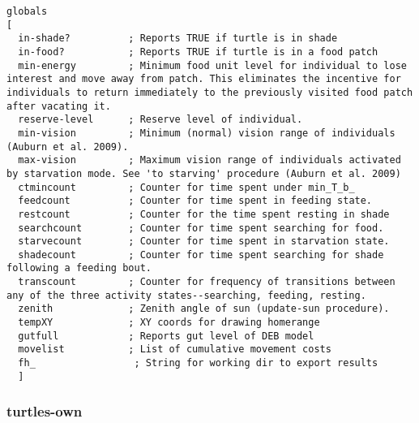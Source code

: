 \documentclass[]{article}
\begin{document}
\begin{verbatim}
globals
[
  in-shade?          ; Reports TRUE if turtle is in shade
  in-food?           ; Reports TRUE if turtle is in a food patch
  min-energy         ; Minimum food unit level for individual to lose interest and move away from patch. This eliminates the incentive for individuals to return immediately to the previously visited food patch after vacating it.
  reserve-level      ; Reserve level of individual.
  min-vision         ; Minimum (normal) vision range of individuals (Auburn et al. 2009).
  max-vision         ; Maximum vision range of individuals activated by starvation mode. See 'to starving' procedure (Auburn et al. 2009)
  ctmincount         ; Counter for time spent under min_T_b_
  feedcount          ; Counter for time spent in feeding state.
  restcount          ; Counter for the time spent resting in shade
  searchcount        ; Counter for time spent searching for food.
  starvecount        ; Counter for time spent in starvation state.
  shadecount         ; Counter for time spent searching for shade following a feeding bout.
  transcount         ; Counter for frequency of transitions between any of the three activity states--searching, feeding, resting.
  zenith             ; Zenith angle of sun (update-sun procedure).
  tempXY             ; XY coords for drawing homerange 
  gutfull            ; Reports gut level of DEB model
  movelist           ; List of cumulative movement costs
  fh_                 ; String for working dir to export results
  ]
\end{verbatim}

\subsubsection{turtles-own}\label{turtles-own}
\end{document}
